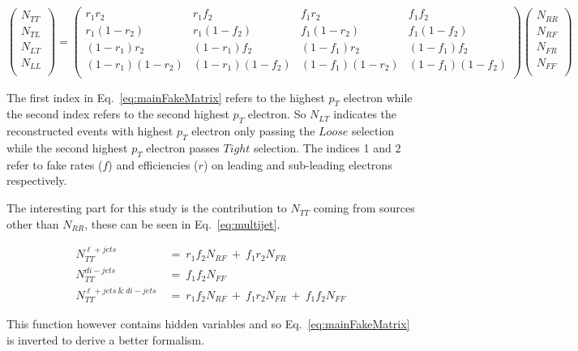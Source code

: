 \begin{equation} \label{eq:mainFakeMatrix}
   \begin{pmatrix}
      N_{TT} \\
      N_{TL} \\
      N_{LT} \\
      N_{LL} \\
   \end{pmatrix}
   =
   \begin{pmatrix}
      r_{1}r_{2} & r_{1}f_{2} & f_{1}r_{2} & f_{1}f_{2} \\
      r_{1}(1-r_{2}) & r_{1}(1-f_{2}) & f_{1}(1-r_{2}) & f_{1}(1-f_{2}) \\
      (1-r_{1})r_{2} & (1-r_{1})f_{2} & (1-f_{1})r_{2} & (1-f_{1})f_{2} \\
      (1-r_{1})(1-r_{2}) & (1-r_{1})(1-f_{2}) & (1-f_{1})(1-r_{2}) & (1-f_{1})(1-f_{2}) \\
   \end{pmatrix}
   \begin{pmatrix}
      N_{RR} \\
      N_{RF} \\
      N_{FR} \\
      N_{FF} \\
   \end{pmatrix}
\end{equation}

The first index in Eq.~\ref{eq:mainFakeMatrix} refers to the highest $p_{T}$ electron while the second index refers to the second highest $p_{T}$ electron. So $N_{LT}$ indicates the reconstructed events with highest $p_{T}$ electron only passing the $Loose$ selection while the second highest $p_{T}$ electron passes $Tight$ selection. The indices 1 and 2 refer to fake rates ($f$) and efficiencies ($r$) on leading and sub-leading electrons respectively.

The interesting part for this study is the contribution to $N_{TT}$ coming from sources other than $N_{RR}$, these can be seen in Eq.~\ref{eq:multijet}.

\begin{align} \label{eq:multijet}
   N^{\ell+jets}_{TT}~&=~r_{1}f_{2}N_{RF}~+~f_{1}r_{2}N_{FR} \nonumber \\
   N^{di-jets}_{TT}~&=~f_{1}f_{2}N_{FF} \nonumber \\
   N^{\ell+jets~\&~di-jets}_{TT}~&=~r_{1}f_{2}N_{RF}~+~f_{1}r_{2}N_{FR}~+~f_{1}f_{2}N_{FF} 
\end{align}

This function however contains hidden variables and so Eq.~\ref{eq:mainFakeMatrix} is inverted to derive a better formalism.

